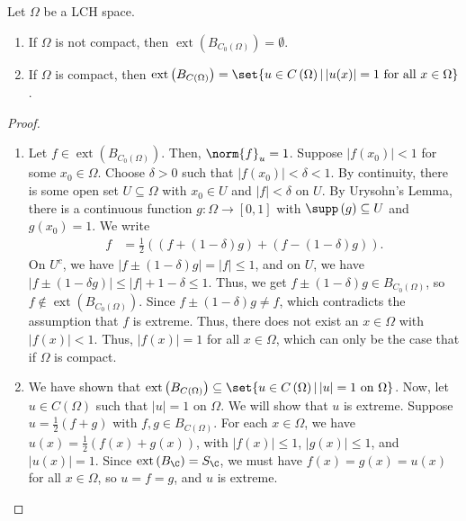 \documentclass[10pt]{mypackage}
\begin{document}
\begin{proposition}
  Let $\Omega$ be a LCH space.
  \begin{enumerate}[(1)]
    \item If $\Omega$ is not compact, then $\operatorname{ext}\left(B_{C_{0}\left(\Omega\right)}\right) = \emptyset$.
    \item If $\Omega$ is compact, then $\operatorname{ext}\left(B_{C(\Omega)}\right) = \set{u\in C\left(\Omega\right) | \left\vert u(x) \right\vert = 1\text{ for all }x\in \Omega}$.
  \end{enumerate}
\end{proposition}
\begin{proof}\hfill
  \begin{enumerate}[(1)]
    \item Let $f\in \operatorname{ext}\left(B_{C_{0}\left(\Omega\right)}\right)$. Then, $\norm{f}_u = 1$. Suppose $\left\vert f\left(x_0\right) \right\vert < 1$ for some $x_0\in\Omega$. Choose $\delta > 0$ such that $\left\vert f\left(x_0\right) \right\vert < \delta < 1$. By continuity, there is some open set $U\subseteq \Omega$ with $x_0\in U$ and $\left\vert f \right\vert < \delta$ on $U$. By Urysohn's Lemma, there is a continuous function $g \colon \Omega\rightarrow [0,1]$ with $\supp\left(g\right) \subseteq U$ and $g\left(x_0\right) = 1$. We write
      \begin{align*}
        f &= \frac{1}{2}\left(\left(f + \left(1-\delta\right)g\right) + \left(f-\left(1-\delta\right)g\right)\right).
      \end{align*}
      On $U^{c}$, we have $\left\vert f\pm \left(1-\delta\right)g \right\vert = \left\vert f \right\vert \leq 1$, and on $U$, we have $\left\vert f\pm \left(1-\delta g\right) \right\vert \leq \left\vert f \right\vert + 1-\delta \leq 1$. Thus, we get $f\pm \left(1-\delta\right)g \in B_{C_{0}\left(\Omega\right)}$, so $f\notin \operatorname{ext}\left(B_{C_{0}\left(\Omega\right)}\right)$. Since $f\pm \left(1-\delta\right)g \neq f$, which contradicts the assumption that $f$ is extreme. Thus, there does not exist an $x\in \Omega$ with $\left\vert f(x) \right\vert < 1$. Thus, $\left\vert f(x) \right\vert = 1$ for all $x\in \Omega$, which can only be the case that if $\Omega$ is compact.
    \item We have shown that $\operatorname{ext}\left(B_{C\left(\Omega\right)}\right)\subseteq \set{u\in C\left(\Omega\right) | \left\vert u \right\vert = 1\text{ on }\Omega}$. Now, let $u\in C\left(\Omega\right)$ such that $\left\vert u \right\vert = 1$ on $\Omega$. We will show that $u$ is extreme. Suppose $u = \frac{1}{2}\left(f+g\right)$ with $f,g\in B_{C\left(\Omega\right)}$. For each $x\in \Omega$, we have $u(x) = \frac{1}{2}\left(f(x) + g(x)\right)$, with $\left\vert f(x) \right\vert \leq 1$, $\left\vert g(x) \right\vert \leq 1$, and $\left\vert u(x) \right\vert = 1$. Since $\operatorname{ext}\left(B_{\C}\right) = S_{\C}$, we must have $f(x) = g(x) = u(x)$ for all $x\in \Omega$, so $u = f = g$, and $u$ is extreme.
  \end{enumerate}
\end{proof}
\end{document}
